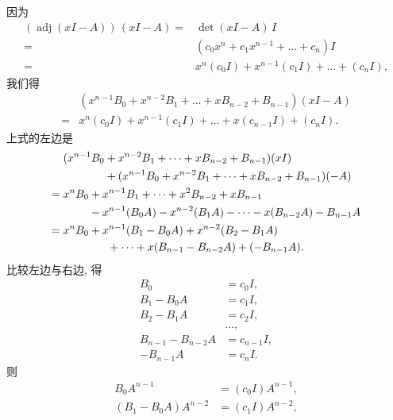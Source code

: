 \documentclass[../libro.tex]{subfiles}
\begin{document}
\begin{example}
    因为
    \begin{align*}
        (\operatorname{adj} {(xI - A)})\, (xI - A)
        = {} &
        \det {(xI - A)}\, I
        \\
        = {} &
        (c_0 x^n + c_1 x^{n-1} + \dots + c_n) I
        \\
        = {} &
        x^n (c_0 I) + x^{n-1} (c_1 I) + \dots + (c_n I),
    \end{align*}
    我们得
    \begin{align*}
        &
        (x^{n-1} B_0 + x^{n-2} B_1 + \dots + x B_{n-2} + B_{n-1})
        (xI - A)
        \\
        = {} &
        x^n (c_0 I) + x^{n-1} (c_1 I) + \dots + x (c_{n-1} I) + (c_n I).
    \end{align*}
    上式的左边是
    \begin{align*}
        &
        (x^{n-1} B_0 + x^{n-2} B_1 + \dots + x B_{n-2} + B_{n-1})
        (xI)
        \\
        & \hphantom{(x^{n-1} B_0} %
        +
        (x^{n-1} B_0 + x^{n-2} B_1 + \dots + x B_{n-2} + B_{n-1})
        (-A)
        \\
        = {} &
        x^n B_0 + x^{n-1} B_1 + \dots + x^2 B_{n-2} + x B_{n-1}
        \\
        &
        \hphantom{x^n B_0}
        - x^{n-1} (B_0 A) - x^{n-2} (B_1 A) - \dots
        - x (B_{n-2} A) - B_{n-1} A
        \\
        = {} &
        x^n B_0 + x^{n-1} (B_1 - B_0 A)
        + x^{n-2} (B_2 - B_1 A)
        \\
        &
        \qquad \qquad
        + \dots
        + x (B_{n-1} - B_{n-2} A)
        + (- B_{n-1} A).
    \end{align*}
    比较左边与右边, 得
    \begin{align*}
        B_0                 & = c_0 I,     \\
        B_1 - B_0 A         & = c_1 I,     \\
        B_2 - B_1 A         & = c_2 I,     \\
        & \dots, \\
        B_{n-1} - B_{n-2} A & = c_{n-1} I, \\
        - B_{n-1} A         & = c_n I.
    \end{align*}
    则
    \begin{align*}
        B_0 A^{n-1}               & = (c_0 I) A^{n-1}, \\
        (B_1 - B_0 A) A^{n-2}     & = (c_1 I) A^{n-2}, \\

\end{align*}
\end{example}
\end{document}
